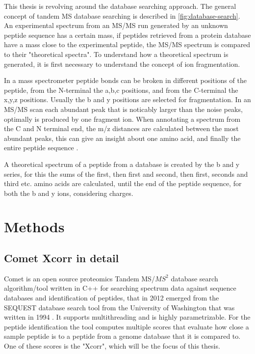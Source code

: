 \documentclass[11pt]{article}
\begin{document}
This thesis is revolving around the database searching approach. The general concept of tandem MS database searching is described in \cref{fig:database-search}. An experimental spectrum from an MS/MS run generated by an unknown peptide sequence has a certain mass, if peptides retrieved from a protein database have a mass close to the experimental peptide, the MS/MS spectrum is compared to their "theoretical spectra". To understand how a theoretical spectrum is generated, it is first necessary to understand the concept of ion fragmentation. 

In a mass spectrometer peptide bonds can be broken in different positions of the peptide, from the N-terminal the a,b,c positions, and from the C-terminal the x,y,z positions. Usually the b and y positions are selected for fragmentation. In an MS/MS scan each abundant peak that is noticably larger than the noise peaks, optimally is produced by one fragment ion. When annotating a spectrum from the C and N terminal end, the m/z distances are calculated between the most abundant peaks, this can give an insight about one amino acid, and finally the entire peptide sequence \cite{b-y-ions}.

A theoretical spectrum of a peptide from a database is created by the b and y series, for this the sums of the first, then first and second, then first, seconds and third etc. amino acids are calculated, until the end of the peptide sequence, for both the b and y ions, considering charges.

\section{Methods}
\subsection{Comet Xcorr in detail}
Comet is an open source proteomics Tandem MS/\(MS^2\) database search algorithm/tool written in C++ for searching spectrum data against sequence databases and identification of peptides, that in 2012 emerged from the SEQUEST database search tool from the University of Washington that was written in 1994 \cite{comet-search-tool}. It supports multithreading and is highly parametrizable. For the peptide identification the tool computes multiple scores that evaluate how close a sample peptide is to a peptide from a genome database that it is compared to. One of these scores is the "Xcorr", which will be the focus of this thesis. 
\end{document}
